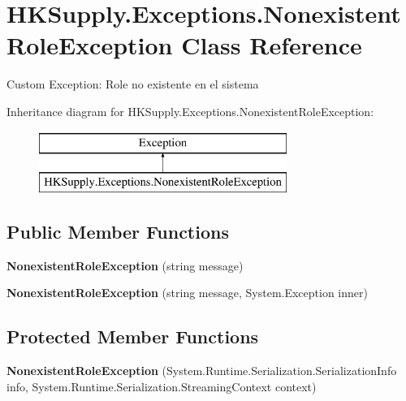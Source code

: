 \hypertarget{class_h_k_supply_1_1_exceptions_1_1_nonexistent_role_exception}{}\section{H\+K\+Supply.\+Exceptions.\+Nonexistent\+Role\+Exception Class Reference}
\label{class_h_k_supply_1_1_exceptions_1_1_nonexistent_role_exception}


Custom Exception\+: Role no existente en el sistema  


Inheritance diagram for H\+K\+Supply.\+Exceptions.\+Nonexistent\+Role\+Exception\+:\begin{figure}[H]
\begin{center}
\leavevmode
\includegraphics[height=2.000000cm]{class_h_k_supply_1_1_exceptions_1_1_nonexistent_role_exception}
\end{center}
\end{figure}
\subsection*{Public Member Functions}
\begin{DoxyCompactItemize}
\item 
\mbox{\label{class_h_k_supply_1_1_exceptions_1_1_nonexistent_role_exception_ad6df76d8577e9e36a22d4e320164ad67}} 
{\bfseries Nonexistent\+Role\+Exception} (string message)
\item 
\mbox{\label{class_h_k_supply_1_1_exceptions_1_1_nonexistent_role_exception_a052f5db9c0a3c96f399ca79b85f4d6c4}} 
{\bfseries Nonexistent\+Role\+Exception} (string message, System.\+Exception inner)
\end{DoxyCompactItemize}
\subsection*{Protected Member Functions}
\begin{DoxyCompactItemize}
\item 
\mbox{\label{class_h_k_supply_1_1_exceptions_1_1_nonexistent_role_exception_a27e00d104dc6cbafcf96df82e6f92474}} 
{\bfseries Nonexistent\+Role\+Exception} (System.\+Runtime.\+Serialization.\+Serialization\+Info info, System.\+Runtime.\+Serialization.\+Streaming\+Context context)
\end{DoxyCompactItemize}


